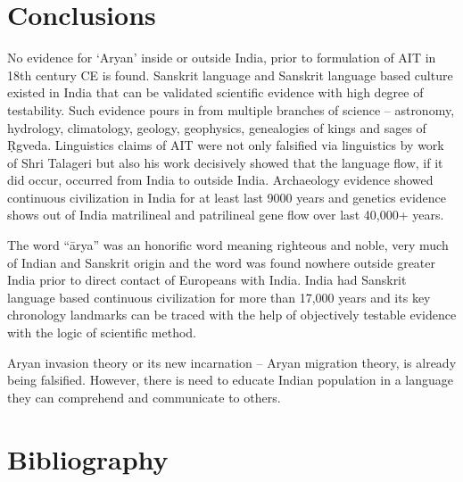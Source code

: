 \section*{Conclusions}

No evidence for ‘Aryan’ inside or outside India, prior to formulation of AIT in 18th century CE is found. Sanskrit language and Sanskrit language based culture existed in India that can be validated scientific evidence with high degree of testability. Such evidence pours in from multiple branches of science – astronomy, hydrology, climatology, geology, geophysics, genealogies of kings and sages of Ṛgveda. Linguistics claims of AIT were not only falsified via linguistics by work of Shri Talageri but also his work decisively showed that the language flow, if it did occur, occurred from India to outside India. Archaeology evidence showed continuous civilization in India for at least last 9000 years and genetics evidence shows out of India matrilineal and patrilineal gene flow over last 40,000+ years.

The word “ārya” was an honorific word meaning righteous and noble, very much of Indian and Sanskrit origin and the word was found nowhere outside greater India prior to direct contact of Europeans with India. India had Sanskrit language based continuous civilization for more than 17,000 years and its key chronology landmarks can be traced with the help of objectively testable evidence with the logic of scientific method.

Aryan invasion theory or its new incarnation – Aryan migration theory, is already being falsified. However, there is need to educate Indian population in a language they can comprehend and communicate to others.


\section*{Bibliography}

